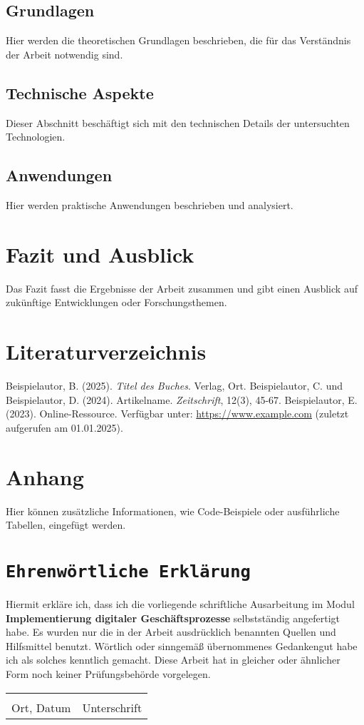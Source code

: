 \documentclass[a4paper,12pt]{article}
\begin{document}
\subsection{Grundlagen}
Hier werden die theoretischen Grundlagen beschrieben, die für das Verständnis der Arbeit notwendig sind.

\subsection{Technische Aspekte}
Dieser Abschnitt beschäftigt sich mit den technischen Details der untersuchten Technologien.

\subsection{Anwendungen}
Hier werden praktische Anwendungen beschrieben und analysiert.

\section{Fazit und Ausblick}
Das Fazit fasst die Ergebnisse der Arbeit zusammen und gibt einen Ausblick auf zukünftige Entwicklungen oder Forschungsthemen.

\newpage
{}
\section*{Literaturverzeichnis}
\begin{thebibliography}{99}
     Beispielautor, B. (2025). \textit{Titel des Buches}. Verlag, Ort.
     Beispielautor, C. und Beispielautor, D. (2024). Artikelname. \textit{Zeitschrift}, 12(3), 45-67.
     Beispielautor, E. (2023). Online-Ressource. Verfügbar unter: \url{https://www.example.com} (zuletzt aufgerufen am 01.01.2025).
\end{thebibliography}

\newpage
\appendix
\section{Anhang}
Hier können zusätzliche Informationen, wie Code-Beispiele oder ausführliche Tabellen, eingefügt werden.

\newpage
{}
\section*{\texttt{Ehrenwörtliche Erklärung}}
Hiermit erkläre ich, dass ich die vorliegende schriftliche Ausarbeitung im Modul \textbf{Implementierung digitaler Geschäftsprozesse} selbstständig
angefertigt habe. Es wurden nur die in der Arbeit ausdrücklich benannten Quellen und
Hilfsmittel benutzt. Wörtlich oder sinngemäß übernommenes Gedankengut habe ich als
solches kenntlich gemacht. Diese Arbeit hat in gleicher oder ähnlicher Form noch keiner
Prüfungsbehörde vorgelegen.

\vspace{3cm}
\noindent\begin{tabular}{p{}p{}}
    \hrulefill & \hrulefill \\
    Ort, Datum & Unterschrift \\
\end{tabular}
\end{document}
